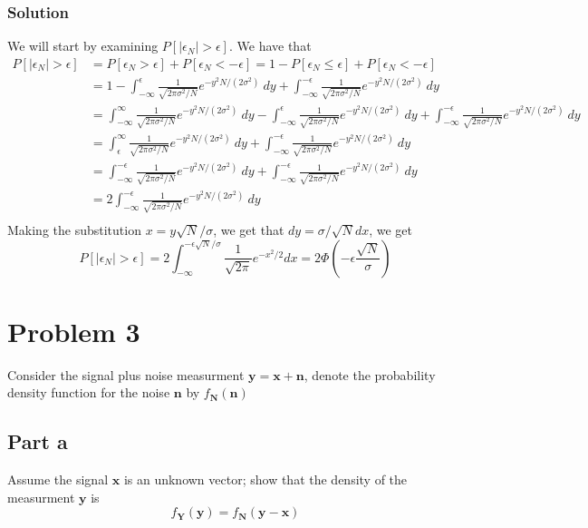 \documentclass[a4paper]{article}
\begin{document}
\subsubsection*{Solution}%
We will start by examining $P[|\epsilon_N| > \epsilon]$. We have that
\[
  \begin{aligned}
    P[ |\epsilon_N| > \epsilon] &= P[ \epsilon_N > \epsilon] + P[\epsilon_N < -\epsilon] = 1 - P[\epsilon_N \leq \epsilon] + P[\epsilon_N < -\epsilon] \\
                                &= 1 - \int_{-\infty}^{\epsilon} \frac{1}{\sqrt{2\pi \sigma^2/N}} e^{-y^2N/(2\sigma^2)}\ dy + \int_{-\infty}^{-\epsilon} \frac{1}{\sqrt{2\pi \sigma^2/N}} e^{-y^2N/(2\sigma^2)}\ dy \\
                                &= \int_{-\infty}^{\infty} \frac{1}{\sqrt{2\pi \sigma^2/N}} e^{-y^2N/(2\sigma^2)}\ dy - \int_{-\infty}^{\epsilon} \frac{1}{\sqrt{2\pi \sigma^2/N}} e^{-y^2N/(2\sigma^2)}\ dy + \int_{-\infty}^{-\epsilon} \frac{1}{\sqrt{2\pi \sigma^2/N}} e^{-y^2N/(2\sigma^2)}\ dy \\
                                &= \int_{\epsilon}^{\infty} \frac{1}{\sqrt{2\pi \sigma^2/N}} e^{-y^2N/(2\sigma^2)}\ dy + \int_{-\infty}^{-\epsilon} \frac{1}{\sqrt{2\pi \sigma^2/N}} e^{-y^2N/(2\sigma^2)}\ dy \\
                                &= \int_{-\infty}^{-\epsilon} \frac{1}{\sqrt{2\pi \sigma^2/N}} e^{-y^2N/(2\sigma^2)}\ dy + \int_{-\infty}^{-\epsilon} \frac{1}{\sqrt{2\pi \sigma^2/N}} e^{-y^2N/(2\sigma^2)}\ dy \\
                                &= 2\int_{-\infty}^{-\epsilon} \frac{1}{\sqrt{2\pi \sigma^2/N}} e^{-y^2N/(2\sigma^2)}\ dy \\
  \end{aligned}
\]
Making the substitution $x = y\sqrt{N}/\sigma$, we get that $dy = \sigma/\sqrt{N} dx$, we get
\[
  P[ |\epsilon_N| > \epsilon] = 2\int_{-\infty}^{-\epsilon \sqrt{N}/\sigma} \frac{1}{\sqrt{2\pi}}e^{-x^2/2} dx = 2 \Phi \left( -\epsilon \frac{\sqrt{N}}{\sigma} \right)
\]

\section*{Problem 3}%
Consider the signal plus noise measurment $\mathbf{y} = \mathbf{x} + \mathbf{n}$, denote the probability density function for the noise $\mathbf{n}$ by $f_{\mathbf{N}}(\mathbf{n})$

\subsection*{Part a}%
Assume the signal $\mathbf{x}$ is an unknown vector; show that the density of the measurment $\mathbf{y}$ is
\[
  f_{\mathbf{Y}}(\mathbf{y}) = f_{\mathbf{N}}(\mathbf{y} - \mathbf{x})
\]
\end{document}
